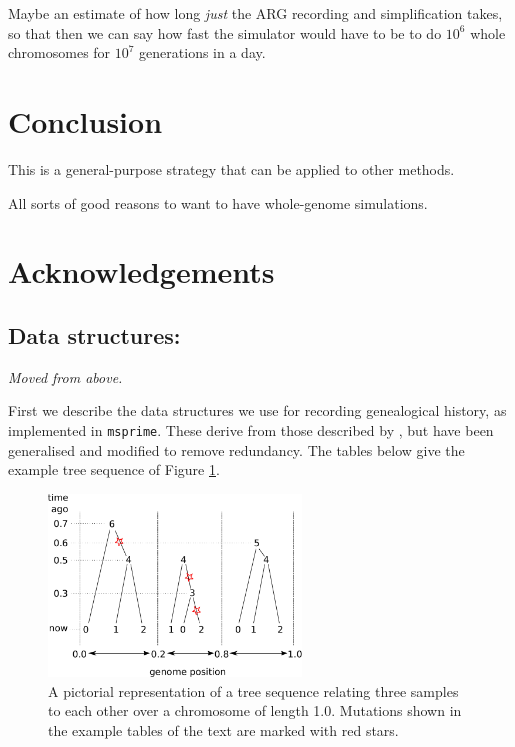 \documentclass{article}
\newcommand{\msprime}{\texttt{msprime}}
\newcommand{\jk}[1]{{\em \color{red} #1}}
\begin{document}
Maybe an estimate of how long \emph{just} the ARG recording and simplification takes,
so that then we can say how fast the simulator would have to be to do $10^6$ whole chromosomes for $10^7$ generations
in a day.

\section*{Conclusion}

This is a general-purpose strategy that can be applied to other methods.

All sorts of good reasons to want to have whole-genome simulations.

\section*{Acknowledgements}




\appendix

\subsection*{Data structures:}
\jk{Moved from above.}

First we describe the data structures we use for recording genealogical history,
as implemented in \msprime.
These derive from those described by \citet{kelleher2016efficient},
but have been generalised and modified to remove redundancy.
The tables below give the example tree sequence of Figure \ref{fig:ex_tree_seq}.

\begin{figure}
    \begin{center}
        \includegraphics[width=0.6\textwidth]{example_tree_seq}
    \end{center}
    \caption{
        A pictorial representation of a tree sequence
        relating three samples to each other
        over a chromosome of length 1.0.
        Mutations shown in the example tables of the text
        are marked with red stars.
        \label{fig:ex_tree_seq}
    }
\end{figure}
\end{document}
